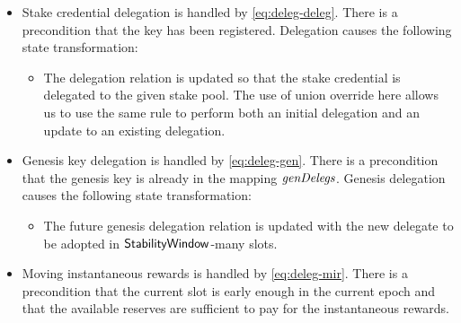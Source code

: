 \begin{itemize}
  \item Stake credential delegation is handled by \cref{eq:deleg-deleg}.
    There is a precondition that the key has been registered.
    Delegation causes the following state transformation:
    \begin{itemize}
    \item The delegation relation is updated so that the stake credential is
      delegated to the given stake pool. The use of union override here allows
      us to use the same rule to perform both an initial delegation and an
      update to an existing delegation.
    \end{itemize}

  \item Genesis key delegation is handled by \cref{eq:deleg-gen}.
    There is a precondition that the genesis key is already in the mapping $\mathit{genDelegs}$.
    Genesis delegation causes the following state transformation:
    \begin{itemize}
      \item The future genesis delegation relation is updated with the new delegate
        to be adopted in $\mathsf{StabilityWindow}$-many slots.
      \end{itemize}

    \item  Moving instantaneous rewards is handled by \cref{eq:deleg-mir}. There
      is a precondition that the current slot is early enough in the current
      epoch and that the available reserves are sufficient to pay for the
      instantaneous rewards.
\end{itemize}



